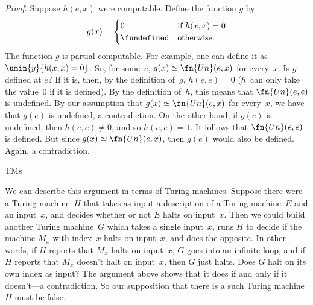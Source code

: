 \documentclass[../../../include/open-logic-section]{subfiles}
\begin{document}
\begin{proof}
Suppose $h(e,x)$ were computable. Define the function $g$ by
\[
g(x) =
\begin{cases}
  0                & \text{if $h(x,x) = 0$} \\
  \fundefined & \text{otherwise.}
\end{cases}
\]
The function $g$ is partial computable. For example, one can define it
as $\umin{y}{h(x,x) = 0}$. So, for some~$e$, $g(x) \simeq \fn{Un}(e,
x)$ for every~$x$. Is $g$ defined at $e$?  If it is, then, by the
definition of~$g$, $h(e,e) = 0$ ($h$~can only take the value~$0$ if it
is defined). By the definition of~$h$, this means that $\fn{Un}(e, e)$
is undefined. By our assumption that $g(x) \simeq \fn{Un}(e, x)$
for every~$x$, we have that $g(e)$ is undefined, a contradiction.
On the other hand, if $g(e)$ is undefined, then $h(e,e) \neq 0$, and
so $h(e,e) = 1$. It follows that $\fn{Un}(e, e)$ is defined. But since
$g(x) \simeq \fn{Un}(e, x)$, then $g(e)$ would also be defined. Again,
a contradiction.
\end{proof}

\begin{tagblock}{TMs}
\begin{explain}
We can describe this argument in terms of Turing machines.  Suppose
there were a Turing machine~$H$ that takes as input a description of a
Turing machine~$E$ and an input~$x$, and decides whether or not $E$
halts on input~$x$. Then we could build another Turing machine~$G$
which takes a single input~$x$, runs $H$ to decide if the machine
$M_x$ with index~$x$ halts on input~$x$, and does the opposite. In
other words, if $H$ reports that $M_x$ halts on input~$x$, $G$ goes
into an infinite loop, and if $H$ reports that $M_x$ doesn't halt on
input~$x$, then $G$ just halts. Does $G$ halt on its own index as
input? The argument above shows that it does if and only if it
doesn't---a contradiction. So our supposition that there is a such
Turing machine~$H$ must be false.
\end{explain}
\end{tagblock}
\end{document}
